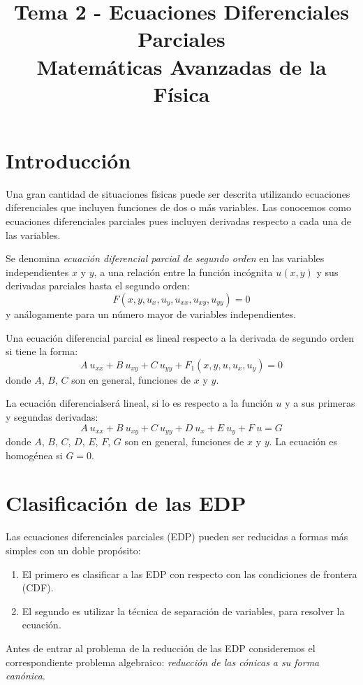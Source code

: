 
\title{Tema 2 - Ecuaciones Diferenciales Parciales \\ {\large Matemáticas Avanzadas de la Física}}
\date{ }

\maketitle
\fontsize{14}{14}\selectfont
\section{Introducción}
Una gran cantidad de situaciones físicas puede ser descrita utilizando ecuaciones diferenciales que incluyen funciones de dos o más variables. Las conocemos como ecuaciones diferenciales parciales pues incluyen derivadas respecto a cada una de las variables.
\par
Se denomina \emph{ecuación diferencial parcial de segundo orden} en las variables independientes $x$ y $y$, a una relación entre la función incógnita $u(x, y)$ y sus derivadas parciales hasta el segundo orden:
\[ F (x, y, u_{x}, u_{y}, u_{xx}, u_{xy}, u_{yy}) = 0 \]
y análogamente para un número mayor de variables independientes.
\par
Una ecuación diferencial parcial es lineal respecto a la derivada de segundo orden si tiene la forma:
\[ A \: u_{xx} + B \: u_{xy} + C \: u_{yy} + F_{1} (x, y, u, u_{x}, u_{y} ) = 0 \]
donde $A$, $B$, $C$ son en general, funciones de $x$ y $y$.
\par
La ecuación diferencialserá lineal, si lo es respecto a la función $u$ y a sus primeras y segundas derivadas:
\[ A \: u_{xx} + B \: u_{xy} + C \: u_{yy} + D \: u_{x} + E \: u_{y} + F \: u = G \]
donde $A$, $B$, $C$, $D$, $E$, $F$, $G$ son en general, funciones de $x$ y $y$. La ecuación es homogénea si $G = 0$.
\section{Clasificación de las EDP}
Las ecuaciones diferenciales parciales (EDP) pueden ser reducidas a formas más simples con un doble propósito:
\begin{enumerate}
\item El primero es clasificar a las EDP con respecto con las condiciones de frontera (CDF).
\item  El segundo es utilizar la técnica de separación de variables, para resolver la ecuación.
\end{enumerate}
Antes de entrar al problema de la reducción de las EDP consideremos el correspondiente problema algebraico: \emph{reducción de las cónicas a su forma canónica}.
